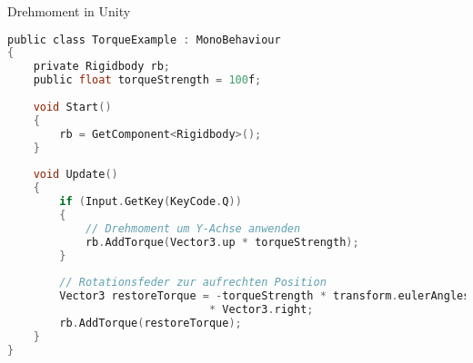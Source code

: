 \begin{code}{Drehmoment in Unity}
\begin{lstlisting}[language=C, style=basesmol]
public class TorqueExample : MonoBehaviour 
{
    private Rigidbody rb;
    public float torqueStrength = 100f;
    
    void Start() 
    {
        rb = GetComponent<Rigidbody>();
    }
    
    void Update() 
    {
        if (Input.GetKey(KeyCode.Q)) 
        {
            // Drehmoment um Y-Achse anwenden
            rb.AddTorque(Vector3.up * torqueStrength);
        }
        
        // Rotationsfeder zur aufrechten Position
        Vector3 restoreTorque = -torqueStrength * transform.eulerAngles.x 
                               * Vector3.right;
        rb.AddTorque(restoreTorque);
    }
}
\end{lstlisting}
\end{code}

